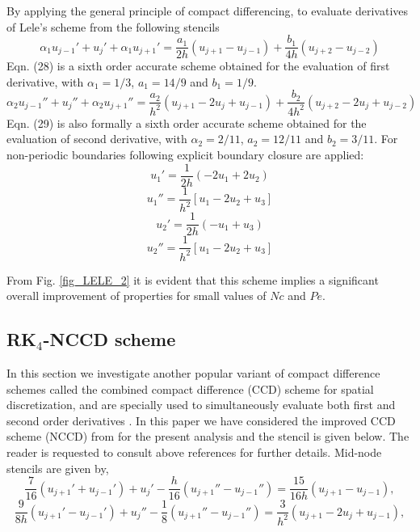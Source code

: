 \documentclass[showpacs,preprintnumbers,amsmath,amssymb]{revtex4-1} %
\begin{document}
By applying the general principle of compact differencing, to evaluate derivatives of Lele's scheme from the following stencils
\begin{equation}
\alpha_1 u_{j-1}'+u_j'+\alpha_1 u_{j+1}'=\frac{a_1}{2h} (u_{j+1}-u_{j-1})+\frac{b_1}{4h} (u_{j+2}-u_{j-2})
\end{equation}
Eqn. (28) is a sixth order accurate scheme obtained for the evaluation of first derivative, with $\alpha_1=1/3$, $a_1=14/9$ and $b_1=1/9$. 
\begin{equation}
\alpha_2 u_{j-1}''+u_j''+\alpha_2 u_{j+1}''=\frac{a_2}{h^2} (u_{j+1}-2u_{j}+u_{j-1})+\frac{b_2}{4h^2} (u_{j+2}-2u_{j}+u_{j-2})
\end{equation}
Eqn. (29) is also formally a sixth order accurate scheme obtained for the evaluation of second derivative, with $\alpha_2=2/11$, $a_2=12/11$ and $b_2=3/11$.
For non-periodic boundaries following explicit boundary closure are applied:
\begin{equation}
u_1'=\frac{1}{2h}(-2u_1+2u_2)
\end{equation}
\begin{equation}
u_1''=\frac{1}{h^2}[u_1-2u_2+u_3]
\end{equation}
\begin{equation}
u_2'=\frac{1}{2h}(-u_1+u_3)
\end{equation}
\begin{equation}
u_2''=\frac{1}{h^2}[u_1-2u_2+u_3]
\end{equation}

From Fig. \ref{fig_LELE_2} it is evident that this scheme implies a significant overall improvement of properties for small values of $Nc$ and $Pe$.

\subsection{RK$_4$-NCCD scheme}
In this section we investigate another popular variant of compact difference schemes called the combined compact difference (CCD) scheme for spatial discretization, and are specially used to simultaneously evaluate both first and second order derivatives \cite{CHU_AND_FAN, ZHOU_ET_AL}. In this paper we have considered the improved CCD scheme (NCCD) from \cite{SENGUPTA_Et_al_4} for the present analysis and the stencil is given below. The reader is requested to consult above references for further details. Mid-node stencils are given by,
\begin{equation}
\frac{7}{16}(u_{j+1}'+u_{j-1}')+u_j'-\frac{h}{16}(u_{j+1}''-u_{j-1}'')=\frac{15}{16h}(u_{j+1}-u_{j-1}),
\end{equation}
\begin{equation}
\frac{9}{8h}(u_{j+1}'-u_{j-1}')+u_j''-\frac{1}{8}(u_{j+1}''-u_{j-1}'')=\frac{3}{h^2}(u_{j+1}-2u_j+u_{j-1}),
\end{equation}
\end{document}
